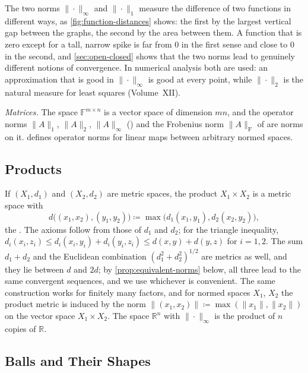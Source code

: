 The two norms $\|\cdot\|_\infty$ and $\|\cdot\|_1$ measure the difference of two functions in different ways, as \cref{fig:function-distances} shows: the first by the largest vertical gap between the graphs, the second by the area between them. A function that is zero except for a tall, narrow spike is far from $0$ in the first sense and close to $0$ in the second, and \cref{sec:open-closed} shows that the two norms lead to genuinely different notions of convergence. In numerical analysis both are used: an approximation that is good in $\|\cdot\|_\infty$ is good at every point, while $\|\cdot\|_2$ is the natural measure for least squares (Volume~XII).

\emph{Matrices.} The space $\mathbb F^{m\times n}$ is a vector space of dimension $mn$, and the operator norms $\|A\|_1$, $\|A\|_2$, $\|A\|_\infty$ () and the Frobenius norm $\|A\|_{\mathrm F}$ of  are norms on it.  defines operator norms for linear maps between arbitrary normed spaces.

\subsection{Products}

If $(X_1,d_1)$ and $(X_2,d_2)$ are metric spaces, the product $X_1\times X_2$ is a metric space with
\[
d\bigl((x_1,x_2),(y_1,y_2)\bigr)\coloneqq\max\bigl(d_1(x_1,y_1),d_2(x_2,y_2)\bigr) ,
\]
the . The axioms follow from those of $d_1$ and $d_2$; for the triangle inequality, $d_i(x_i,z_i)\le d_i(x_i,y_i)+d_i(y_i,z_i)\le d(x,y)+d(y,z)$ for $i=1,2$. The sum $d_1+d_2$ and the Euclidean combination $(d_1^2+d_2^2)^{1/2}$ are metrics as well, and they lie between $d$ and $2d$; by \cref{prop:equivalent-norms} below, all three lead to the same convergent sequences, and we use whichever is convenient. The same construction works for finitely many factors, and for normed spaces $X_1$, $X_2$ the product metric is induced by the norm $\|(x_1,x_2)\|\coloneqq\max(\|x_1\|,\|x_2\|)$ on the vector space $X_1\times X_2$. The space $\mathbb R^n$ with $\|\cdot\|_\infty$ is the product of $n$ copies of $\mathbb R$.

\subsection{Balls and Their Shapes}

